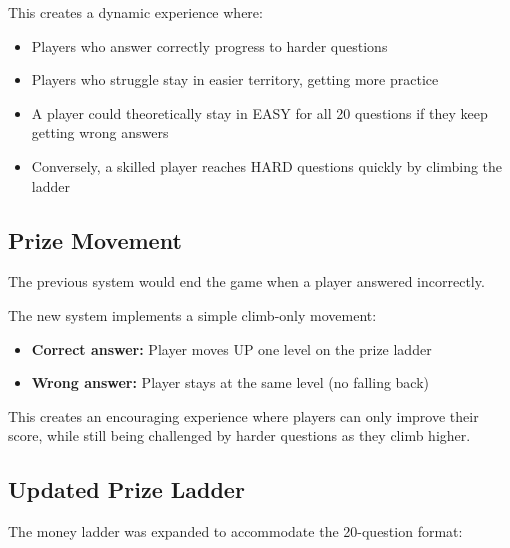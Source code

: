 \documentclass[11pt,a4paper]{article}
\begin{document}
This creates a dynamic experience where:
\begin{itemize}
    \item Players who answer correctly progress to harder questions
    \item Players who struggle stay in easier territory, getting more practice
    \item A player could theoretically stay in EASY for all 20 questions if they keep getting wrong answers
    \item Conversely, a skilled player reaches HARD questions quickly by climbing the ladder
\end{itemize}

\subsection{Prize Movement}

\begin{issuebox}
The previous system would end the game when a player answered incorrectly.
\end{issuebox}

\begin{fixbox}
The new system implements a simple climb-only movement:
\begin{itemize}
    \item \textbf{Correct answer:} Player moves UP one level on the prize ladder
    \item \textbf{Wrong answer:} Player stays at the same level (no falling back)
\end{itemize}
This creates an encouraging experience where players can only improve their score, while still being challenged by harder questions as they climb higher.
\end{fixbox}

\subsection{Updated Prize Ladder}

The money ladder was expanded to accommodate the 20-question format:
\end{document}
